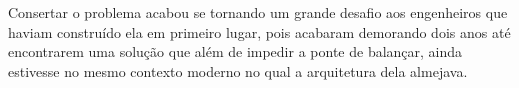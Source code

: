 \documentclass[]{article}
\begin{document}
Consertar o problema acabou se tornando um grande desafio aos engenheiros que haviam construído ela em primeiro lugar, pois acabaram demorando
dois anos até encontrarem uma solução que além de impedir a ponte de balançar, ainda estivesse no mesmo contexto moderno no qual a arquitetura dela almejava.
\end{document}
